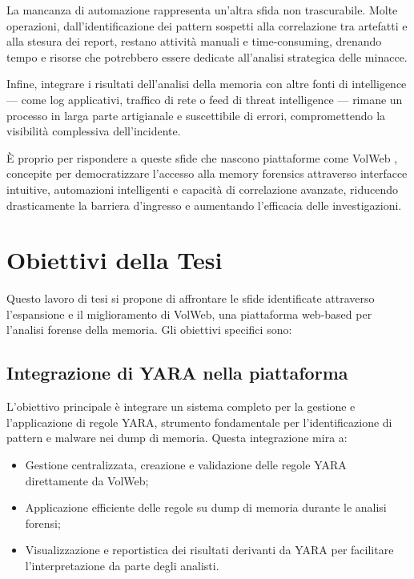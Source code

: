 La mancanza di automazione rappresenta un’altra sfida non trascurabile. Molte operazioni, dall’identificazione dei pattern sospetti alla correlazione tra artefatti e alla stesura dei report, restano attività manuali e time-consuming, drenando tempo e risorse che potrebbero essere dedicate all’analisi strategica delle minacce.

Infine, integrare i risultati dell’analisi della memoria con altre fonti di intelligence — come log applicativi, traffico di rete o feed di threat intelligence — rimane un processo in larga parte artigianale e suscettibile di errori, compromettendo la visibilità complessiva dell'incidente.

È proprio per rispondere a queste sfide che nascono piattaforme come VolWeb \cite{volweb2024}, concepite per democratizzare l’accesso alla memory forensics attraverso interfacce intuitive, automazioni intelligenti e capacità di correlazione avanzate, riducendo drasticamente la barriera d’ingresso e aumentando l’efficacia delle investigazioni.

\section{Obiettivi della Tesi}

Questo lavoro di tesi si propone di affrontare le sfide identificate attraverso l'espansione e il miglioramento di VolWeb, una piattaforma web-based per l'analisi forense della memoria. Gli obiettivi specifici sono:

\subsection{Integrazione di YARA nella piattaforma}

L’obiettivo principale è integrare un sistema completo per la gestione e l’applicazione di regole YARA, strumento fondamentale per l’identificazione di pattern e malware nei dump di memoria. Questa integrazione mira a:

\begin{itemize}
\item Gestione centralizzata, creazione e validazione delle regole YARA direttamente da VolWeb;
\item Applicazione efficiente delle regole su dump di memoria durante le analisi forensi;
\item Visualizzazione e reportistica dei risultati derivanti da YARA per facilitare l’interpretazione da parte degli analisti.
\end{itemize}

